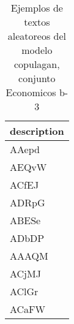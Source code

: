 \begin{table}[H]
\centering
\fontsize{8}{14}\selectfont
\caption{Ejemplos de textos aleatoreos del modelo copulagan, conjunto Economicos b-3}
\label{table-sample10-economicos-b-3-copulagan-text}
\begin{tabular}{|m{50em}|}
\hline
\rowcolor[gray]{0.8}
description \\
\hline AAepd \\
\hline AEQvW \\
\hline ACfEJ \\
\hline ADRpG \\
\hline ABESe \\
\hline ADbDP \\
\hline AAAQM \\
\hline ACjMJ \\
\hline AClGr \\
\hline ACaFW \\
\hline
\end{tabular}
\end{table}
